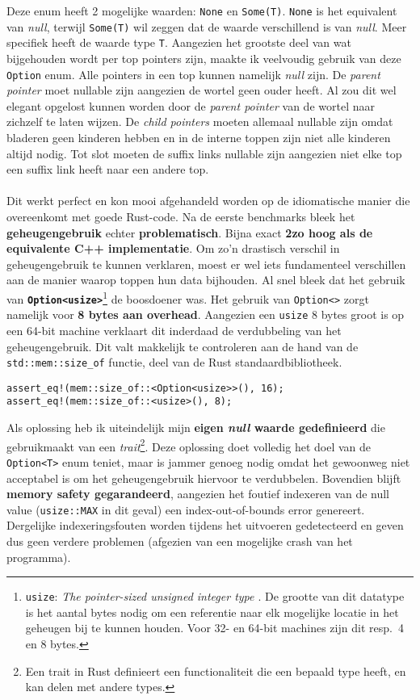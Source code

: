 Deze enum heeft 2 mogelijke waarden: \texttt{None} en \texttt{Some(T)}.
\texttt{None} is het equivalent van \textit{null}, terwijl \texttt{Some(T)} wil zeggen dat de waarde verschillend is van \textit{null}.
Meer specifiek heeft de waarde type \texttt{T}.
Aangezien het grootste deel van wat bijgehouden wordt per top pointers zijn, maakte ik veelvoudig gebruik van deze \texttt{Option} enum.
Alle pointers in een top kunnen namelijk \textit{null} zijn.
De \textit{parent pointer} moet nullable zijn aangezien de wortel geen ouder heeft.
Al zou dit wel elegant opgelost kunnen worden door de \textit{parent pointer} van de wortel naar zichzelf te laten wijzen.
De \textit{child pointers} moeten allemaal nullable zijn omdat bladeren geen kinderen hebben en in de interne toppen zijn niet alle kinderen altijd nodig.
Tot slot moeten de suffix links nullable zijn aangezien niet elke top een suffix link heeft naar een andere top.
\\ \\
Dit werkt perfect en kon mooi afgehandeld worden op de idiomatische manier die overeenkomt met goede Rust-code.
Na de eerste benchmarks bleek het \textbf{geheugengebruik} echter \textbf{problematisch}.
Bijna exact \textbf{2\times zo hoog als de equivalente C++ implementatie}.
Om zo'n drastisch verschil in geheugengebruik te kunnen verklaren, moest er wel iets fundamenteel verschillen aan de manier waarop toppen hun data bijhouden.
Al snel bleek dat het gebruik van \textbf{\texttt{Option<usize>}}\footnote{\texttt{usize}: \textit{The pointer-sized unsigned integer type \cite{usize}}. De grootte van dit datatype is het aantal bytes nodig om een referentie naar elk mogelijke locatie in het geheugen bij te kunnen houden. Voor 32- en 64-bit machines zijn dit resp.~4 en 8 bytes.} de boosdoener was.
Het gebruik van \texttt{Option<>} zorgt namelijk voor \textbf{8 bytes aan overhead}.
Aangezien een \texttt{usize} 8 bytes groot is op een 64-bit machine verklaart dit inderdaad de verdubbeling van het geheugengebruik.
Dit valt makkelijk te controleren aan de hand van de \texttt{std::mem::size\_of} functie, deel van de Rust standaardbibliotheek.
\begin{verbatim}
assert_eq!(mem::size_of::<Option<usize>>(), 16);
assert_eq!(mem::size_of::<usize>(), 8);
\end{verbatim}

Als oplossing heb ik uiteindelijk mijn \textbf{eigen \textit{null} waarde gedefinieerd} die gebruikmaakt van een \textit{trait}\footnote{Een trait in Rust definieert een functionaliteit die een bepaald type heeft, en kan delen met andere types.}.
Deze oplossing doet volledig het doel van de \texttt{Option<T>} enum teniet, maar is jammer genoeg nodig omdat het gewoonweg niet acceptabel is om het geheugengebruik hiervoor te verdubbelen.
Bovendien blijft \textbf{memory safety gegarandeerd}, aangezien het foutief indexeren van de null value (\texttt{usize::MAX} in dit geval) een index-out-of-bounds error genereert.
Dergelijke indexeringsfouten worden tijdens het uitvoeren gedetecteerd en geven dus geen verdere problemen (afgezien van een mogelijke crash van het programma).

